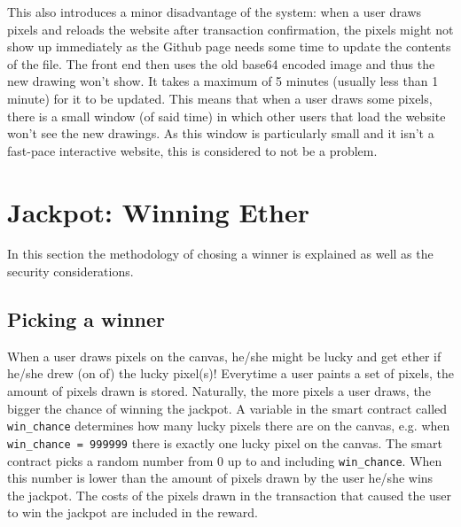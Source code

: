 \documentclass[a4paper]{article}
\begin{document}
This also introduces a minor disadvantage of the system: when a user draws pixels and reloads the website after transaction confirmation, the pixels might not show up immediately as the Github page needs some time to update the contents of the file. The front end then uses the old base64 encoded image and thus the new drawing won't show. It takes a maximum of 5 minutes (usually less than 1 minute) for it to be updated. This means that when a user draws some pixels, there is a small window (of said time) in which other users that load the website won't see the new drawings. As this window is particularly small and it isn't a fast-pace interactive website, this is considered to not be a problem.

\section{Jackpot: Winning Ether}
In this section the methodology of chosing a winner is explained as well as the security considerations. 

\subsection{Picking a winner}
When a user draws pixels on the canvas, he/she might be lucky and get ether if he/she drew (on of) the lucky pixel(s)! Everytime a user paints a set of pixels, the amount of pixels drawn is stored. Naturally, the more pixels a user draws, the bigger the chance of winning the jackpot. A variable in the smart contract called \lstinline{win_chance} determines how many lucky pixels there are on the canvas, e.g. when \lstinline{win_chance = 999999} there is exactly one lucky pixel on the canvas. The smart contract picks a random number from 0 up to and including \lstinline{win_chance}. When this number is lower than the amount of pixels drawn by the user he/she wins the jackpot. The costs of the pixels drawn in the transaction that caused the user to win the jackpot are included in the reward.
\end{document}
